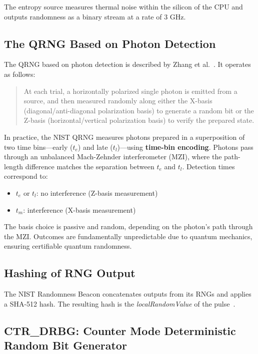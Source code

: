 The entropy source measures thermal noise within the silicon of the CPU and outputs randomness as a binary stream at a rate of 3 GHz.

\subsection{The QRNG Based on Photon Detection}

The QRNG based on photon detection is described by Zhang et al.~\cite{zhang2021}. It operates as follows:

\begin{quote}
At each trial, a horizontally polarized single photon is emitted from a source, and then measured randomly along either the X-basis (diagonal/anti-diagonal polarization basis) to generate a random bit or the Z-basis (horizontal/vertical polarization basis) to verify the prepared state.
\end{quote}

In practice, the NIST QRNG measures photons prepared in a superposition of two time bins---early ($t_e$) and late ($t_l$)---using \textbf{time-bin encoding}. Photons pass through an unbalanced Mach-Zehnder interferometer (MZI), where the path-length difference matches the separation between $t_e$ and $t_l$. Detection times correspond to:
\begin{itemize}
    \item $t_e$ or $t_l$: no interference (Z-basis measurement)
    \item $t_m$: interference (X-basis measurement)
\end{itemize}

The basis choice is passive and random, depending on the photon's path through the MZI. Outcomes are fundamentally unpredictable due to quantum mechanics, ensuring certifiable quantum randomness.

\subsection{Hashing of RNG Output}

The NIST Randomness Beacon concatenates outputs from its RNGs and applies a SHA-512 hash. The resulting hash is the \textit{localRandomValue} of the pulse~\cite{kelsey2021}.

\subsection{CTR\_DRBG: Counter Mode Deterministic Random Bit Generator}
\label{sec:counter_mode_deterministic_random_bit_generator}

